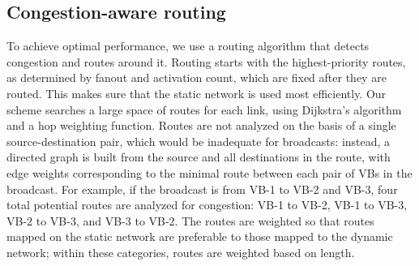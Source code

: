 
\subsection{Congestion-aware routing}
To achieve optimal performance, we use a routing algorithm that detects congestion and routes around it. 
Routing starts with the highest-priority routes, as determined by fanout and activation count, which are fixed after they are routed.
This makes sure that the static network is used most efficiently.
%
Our scheme searches a large space of routes for each link, using Dijkstra's algorithm \cite{dijkstra} and a hop weighting function.
Routes are not analyzed on the basis of a single source-destination pair, which would be inadequate for broadcasts: instead, a directed graph is built from the source and all destinations in the route, with edge weights corresponding to the minimal route between each pair of VBs in the broadcast.
For example, if the broadcast is from VB-1 to VB-2 and VB-3, four total potential routes are analyzed for congestion: VB-1 to VB-2, VB-1 to VB-3, VB-2 to VB-3, and VB-3 to VB-2.
The routes are weighted so that routes mapped on the static network are preferable to those mapped to the dynamic network; within these categories, routes are weighted based on length. 

